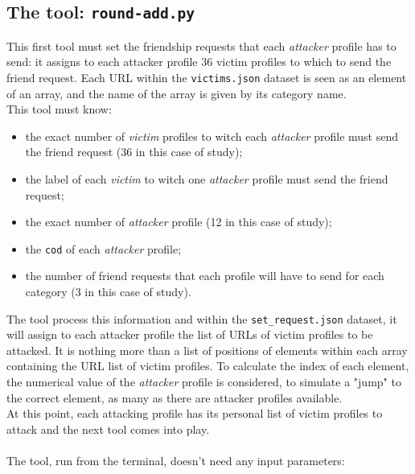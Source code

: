 \subsection{The tool: \texttt{round-add.py}}
This first tool must set the friendship requests that each \textit{attacker} profile has to send: it assigns to each attacker profile $36$ victim profiles to which to send the friend request. 
Each URL within the \texttt{victims.json} dataset is seen as an element of an array, and the name of the array is given by its category name.
\\ This tool must know:
\begin{itemize}
	\item the exact number of \textit{victim} profiles to witch each \textit{attacker} profile must send the friend request (36 in this case of study);
	\item the label of each \textit{victim} to witch one \textit{attacker} profile must send the friend request;
	\item the exact number of \textit{attacker} profile (12 in this case of study);
	\item the \texttt{cod} of each \textit{attacker} profile;
	\item the number of friend requests that each profile will have to send for each category (3 in this case of study).
\end{itemize}
The tool process this information and within the \texttt{set\_request.json} dataset, it will assign to each attacker profile the list of URLs of victim profiles to be attacked. It is nothing more than a list of positions of elements within each array containing the URL list of victim profiles. To calculate the index of each element, the numerical value of the \textit{attacker} profile is considered, to simulate a "jump" to the correct element, as many as there are attacker profiles available.\\
At this point, each attacking profile has its personal list of victim profiles to attack and the next tool comes into play.
\\\\ The tool, run from the terminal, doesn't need any input parameters:

